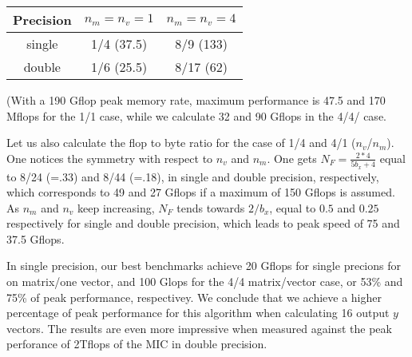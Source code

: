 \begin{center}
\begin{tabular}{|c|c|c|}
\hline
Precision & $n_m=n_v=1$ & $n_m=n_v=4$     \\
\hline
single    &  1/4  (37.5)     &   8/9 (133) \\
double    &  1/6  (25.5)     &   8/17 (62) \\
\hline
\end{tabular}
\end{center}
(With a 190 Gflop peak memory rate, maximum performance is 47.5 and 170 Mflops for the 1/1 case, while we calculate 32 and 90 Gflops in the 4/4/ case. 

Let us also calculate the flop to byte ratio for the case of 1/4 and 4/1 ($n_v$/$n_m$). One notices the symmetry with respect to $n_v$ and $n_m$. 
One gets $N_F = \frac{2*4}{5 b_x + 4}$ equal to 8/24 (=.33) and 8/44 (=.18), in single and double precision, respectively, which corresponds to 49 and 27 Gflops if a maximum of 150 Gflops is assumed.
As $n_m$ and $n_v$ keep increasing, $N_F$ tends towards $2/b_x$, equal to $0.5$ and $0.25$ respectively for single and double precision, which leads to peak speed of 75 and 37.5 Gflops.

In single precision, our best benchmarks achieve 20 Gflops for single precions for on matrix/one vector, and 100 Glops for the 4/4 matrix/vector case, or 53\% and 75\% of peak performance, respectivey. We conclude that we achieve a higher percentage of peak performance for this algorithm when calculating 16 output $y$ vectors. The results are even more impressive when measured against the peak perforance of 2Tflops of the MIC in double precision.
